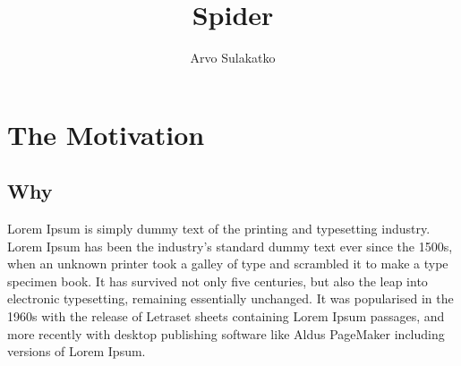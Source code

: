 \documentclass[12pt,leqno]{book}
\title{Spider}
\author{Arvo Sulakatko}
\begin{document}
\maketitle

\part{The Motivation}

\chapter{Why}

Lorem Ipsum is simply dummy text of the printing and typesetting industry.  Lorem Ipsum has been the industry's standard dummy text ever since the 1500s, when an unknown printer took a galley of type and scrambled it to make a type specimen book. It has survived not only five centuries, but also the leap into electronic typesetting, remaining essentially unchanged. It was popularised in the 1960s with the release of Letraset sheets containing Lorem Ipsum passages, and more recently with desktop publishing software like Aldus PageMaker including versions of Lorem Ipsum.
\end{document}
